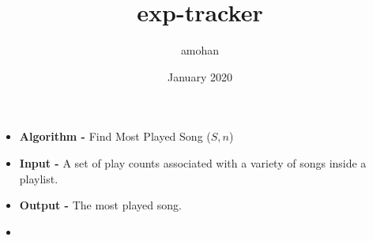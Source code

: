 \documentclass{article}
\title{exp-tracker}
\author{amohan }
\date{January 2020}
\begin{document}
\begin{itemize}
\item[]
\textbf{Algorithm - }Find Most Played Song ($S, n$)
\item[]
\textbf{Input - }A set of play counts associated with a variety of songs inside a playlist.
\item[]
\textbf{Output - }The most played song.
\item[]
\vspace{0.1in}
\end{itemize}
\end{document}
